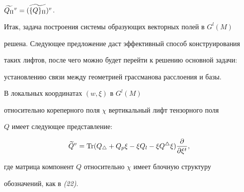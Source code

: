 \begin{cors}


$\widetilde {Q_\Pi }{}^v=\widetilde {(\{ Q\} _\Pi )}{}^v$.


\end{cors}





Итак, задача построения системы образующих векторных полей в $G^l(M)$


решена. Следующее предложение даст эффективный способ конструирования


таких лифтов, после чего можно будет перейти к решению основной задачи:


установлению связи между геометрией грассманова расслоения и базы.





\begin{props} В локальных координатах $(w,\xi )$ в $G^l(M)$


относительно кореперного поля $\chi $ вертикальный лифт тензорного поля


$Q$ имеет следующее представление:


\begin{equation}


\grv Q=\Tr (Q_\tri +Q_p\xi -\xi Q_l-\xi Q^\tri \xi )\ch \xi,


\end{equation}


где матрица компонент $Q$ относительно $\chi $ имеет блочную структуру


обозначений, как в {\em (22)}.


\end{props}






